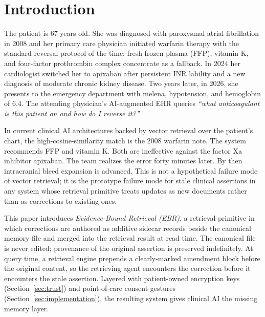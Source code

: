 \documentclass[runningheads]{llncs}
\begin{document}
\section{Introduction}
\label{sec:intro}

The patient is 67 years old. She was diagnosed with paroxysmal atrial
fibrillation in 2008 and her primary care physician initiated warfarin therapy
with the standard reversal protocol of the time: fresh frozen plasma (FFP),
vitamin K, and four-factor prothrombin complex concentrate as a fallback. In
2024 her cardiologist switched her to apixaban after persistent INR lability
and a new diagnosis of moderate chronic kidney disease. Two years later, in
2026, she presents to the emergency department with melena, hypotension, and
hemoglobin of 6.4. The attending physician's AI-augmented EHR queries
\emph{``what anticoagulant is this patient on and how do I reverse it?''}

In current clinical AI architectures backed by vector retrieval over the
patient's chart, the high-cosine-similarity match is the 2008 warfarin note.
The system recommends FFP and vitamin K. Both are ineffective against the
factor Xa inhibitor apixaban. The team realizes the error forty minutes later.
By then intracranial bleed expansion is advanced. This is not a hypothetical
failure mode of vector retrieval; it is the prototype failure mode for stale
clinical assertions in any system whose retrieval primitive treats updates as
new documents rather than as corrections to existing ones.

This paper introduces \emph{Evidence-Bound Retrieval (EBR)}, a retrieval primitive in
which corrections are authored as additive sidecar records beside the
canonical memory file and merged into the retrieval result at read time. The
canonical file is never edited; provenance of the original assertion is
preserved indefinitely. At query time, a retrieval engine prepends a
clearly-marked amendment block before the original content, so the
retrieving agent encounters the correction before it encounters the stale
assertion. Layered with patient-owned encryption keys
(Section~\ref{sec:trust}) and point-of-care consent gestures
(Section~\ref{sec:implementation}), the resulting system gives clinical AI
the missing memory layer.
\end{document}
